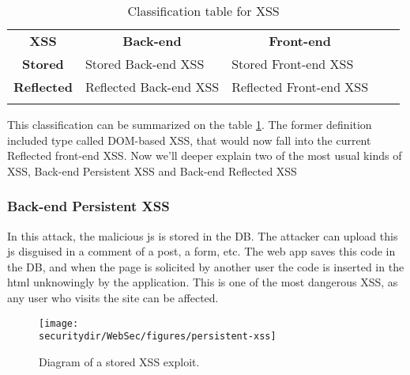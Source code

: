 \begin{table}[htb]
  \centering
  \caption{Classification table for XSS}
  \label{xss-table}
  \begin{tabular}{cllll}
    \cline{2-3}
    \multicolumn{1}{c|}{\textbf{XSS}}        & \multicolumn{1}{c|}{\textbf{Back-end}}      & \multicolumn{1}{c|}{\textbf{Front-end}}      &  &  \\ \cline{1-3}
    \multicolumn{1}{|c|}{\textbf{Stored}}    & \multicolumn{1}{l|}{Stored Back-end XSS}    & \multicolumn{1}{l|}{Stored Front-end XSS}    &  &  \\ \cline{1-3}
    \multicolumn{1}{|c|}{\textbf{Reflected}} & \multicolumn{1}{l|}{Reflected Back-end XSS} & \multicolumn{1}{l|}{Reflected Front-end XSS} &  &  \\ \cline{1-3}
    \multicolumn{1}{l}{}                     &                                             &                                              &  & 
  \end{tabular}
\end{table}
This classification can be summarized on the table \ref{xss-table}. The former definition included type called DOM-based XSS, that would now fall into the current Reflected front-end XSS.
Now we'll deeper explain two of the most usual kinds of XSS, Back-end Persistent XSS and Back-end Reflected XSS

\subsubsection{Back-end Persistent XSS}
In this attack, the malicious js is stored in the DB. The attacker can upload this js disguised in a comment of a post, a form, etc. The web app saves this code in the DB, and when the page is solicited by another user the code is inserted in the html unknowingly by the application. This is one of the most dangerous XSS, as any user who visits the site can be affected.

\begin{figure}[htb]
  \begin{centering}
    \texttt{[image: \\securitydir/WebSec/figures/persistent-xss]}
    \par\end{centering}
  \caption{\label{fig:persistent-xss} Diagram of a stored XSS exploit.}
\end{figure}

